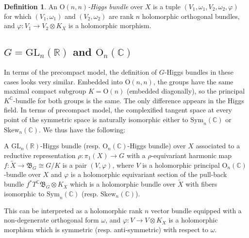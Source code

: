 \documentclass[oneside,11pt]{amsart}
\theoremstyle{definition}
\newtheorem{defn}[thm]{Definition}
\theoremstyle{remark}
\numberwithin{thm}{section}
\numberwithin{equation}{section}
\begin{document}
\begin{defn}
    An \emph{$\mathrm{O}(n,n)$-Higgs bundle} over $X$ is a tuple $(V_1,\omega_1,V_2,\omega_2,\varphi)$ for which $(V_1,\omega_1)$ and $(V_2,\omega_2)$ are rank $n$ holomorphic orthogonal bundles, and $\varphi: V_1\to V_2\otimes K_X$ is a holomorphic morphism.
\end{defn}

\subsection{\texorpdfstring{$G=\mathrm{GL}_n(\mathbb{R})$}{G=GL(n,R)} and \texorpdfstring{$\mathrm{O}_n(\mathbb C)$}{G=O(n,C)}}
In terms of the precompact model, the definition of $G$-Higgs bundles in these cases looks very similar. Embedded into $\mathrm{O}(n,n)$, the groups have the same maximal compact subgroup $K=\mathrm{O}(n)$ (embedded diagonally), so the principal $K^\mathbb C$-bundle for both groups is the same. The only difference appears in the Higgs field. In terms of precompact model, the complexified tangent space at every point of the symmetric space is naturally isomorphic either to $\mathrm{Sym}_n(\mathbb C)$ or $\mathrm{Skew}_n(\mathbb C)$. We thus have the following:

A $\mathrm{GL}_n(\mathbb R)$-Higgs bundle (resp. $\mathrm{O}_n(\mathbb C)$-Higgs bundle) over $X$ associated to a reductive representation $\rho\colon \pi_1(X)\to G$ with a $\rho$-equivariant harmonic map $f\colon\tilde X\to \mathfrak B_G\cong G/K$ is a pair $(V,\varphi)$, where $V$ is a holomorphic principal $\mathrm{O}_n(\mathbb C)$-bundle over $X$ and $\varphi$ is a holomorphic equivariant section of the pull-back bundle $f^*T^\mathbb C\mathfrak B_G\otimes K_X$ which is a holomorphic bundle over $\tilde X$ with fibers isomorphic to  $\mathrm{Sym}_n(\mathbb C)$ (resp. $\mathrm{Skew}_n(\mathbb C)$).

    \vspace{2mm}

    \noindent This can be interpreted as a holomorphic rank $n$ vector bundle equipped with a non-degenerate orthogonal form $\omega$, and $\varphi\colon V\to V\otimes K_X$ is a holomorphic morphism which is symmetric (resp. anti-symmetric) with respect to $\omega$.
\end{document}

